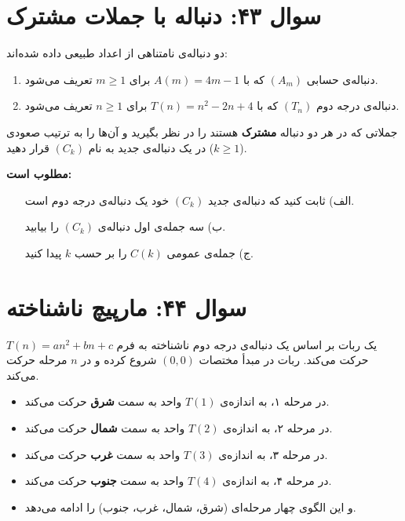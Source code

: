 \documentclass[12pt]{article}
\begin{document}
	\vspace{1cm}
	\hrulefill
	\vspace{1cm}
	
	\section*{سوال ۴۳: دنباله با جملات مشترک}
	دو دنباله‌ی نامتناهی از اعداد طبیعی داده شده‌اند:
	\begin{enumerate}[label=(\roman*)]
		\item دنباله‌ی حسابی \( (A_m) \) که با \( A(m) = 4m - 1 \) برای \(m \ge 1\) تعریف می‌شود.
		\item دنباله‌ی درجه دوم \( (T_n) \) که با \( T(n) = n^2 - 2n + 4 \) برای \(n \ge 1\) تعریف می‌شود.
	\end{enumerate}
	\vspace{0.5cm}
	
	جملاتی که در هر دو دنباله \textbf{مشترک} هستند را در نظر بگیرید و آن‌ها را به ترتیب صعودی در یک دنباله‌ی جدید به نام \( (C_k) \) قرار دهید (\(k \ge 1\)).
	\vspace{0.5cm}
	
	\textbf{مطلوب است:}
	\begin{itemize}
		\item[الف)] ثابت کنید که دنباله‌ی جدید \( (C_k) \) خود یک دنباله‌ی درجه دوم است.
		\item[ب)] سه جمله‌ی اول دنباله‌ی \( (C_k) \) را بیابید.
		\item[ج)] جمله‌ی عمومی \( C(k) \) را بر حسب \(k\) پیدا کنید.
	\end{itemize}
	
	\vspace{1cm}
	
	\vspace{1cm}
	
	\section*{سوال ۴۴: مارپیچ ناشناخته }
	یک ربات بر اساس یک دنباله‌ی درجه دوم ناشناخته به فرم \( T(n) = an^2 + bn + c \) حرکت می‌کند. ربات در مبدأ مختصات \( (0,0) \) شروع کرده و در \(n\) مرحله حرکت می‌کند.
	\begin{itemize}
		\item در مرحله ۱، به اندازه‌ی \(T(1)\) واحد به سمت \textbf{شرق} حرکت می‌کند.
		\item در مرحله ۲، به اندازه‌ی \(T(2)\) واحد به سمت \textbf{شمال} حرکت می‌کند.
		\item در مرحله ۳، به اندازه‌ی \(T(3)\) واحد به سمت \textbf{غرب} حرکت می‌کند.
		\item در مرحله ۴، به اندازه‌ی \(T(4)\) واحد به سمت \textbf{جنوب} حرکت می‌کند.
		\item و این الگوی چهار مرحله‌ای (شرق، شمال، غرب، جنوب) را ادامه می‌دهد.
	\end{itemize}
	\vspace{0.5cm}
	
\end{document}
